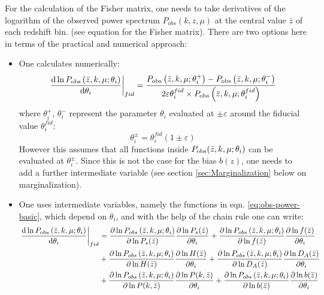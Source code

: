 For the calculation of the Fisher matrix, one needs to take derivatives
of the logarithm of the observed power spectrum $P_{obs}(k,z,\mu)$
at the central value $\bar{z}$ of each redshift bin. (see equation
for the Fisher matrix). There are two options here in terms of the
practical and numerical approach: 
\begin{itemize}
\item One calculates numerically: 
\begin{equation}
\left.\frac{\mbox{d}\ln P_{{\rm obs}}\left(\bar{z},k,\mu;\theta_{i}\right)}{\mbox{d}\theta_{i}}\right|_{fid}=\frac{P_{{\rm obs}}\left(\bar{z},k,\mu;\theta_{i}^{+}\right)-P_{{\rm obs}}\left(\bar{z},k,\mu;\theta_{i}^{-}\right)}{2\varepsilon\theta_{i}^{fid}\times P_{{\rm obs}}\left(\bar{z},k,\mu;\theta_{i}^{fid}\right)}
\end{equation}
where $\theta_{i}^{+}$, $\theta_{i}^{-}$ represent the parameter
$\theta_{i}$ evaluated at $\pm\varepsilon$ around the fiducial value
$\theta_{i}^{fid}$:
\begin{equation}
\theta_{i}^{\pm}=\theta_{i}^{fid}(1\pm\varepsilon)
\end{equation}
However this assumes that all functions inside $P_{{\rm obs}}(\bar{z},k,\mu;\theta_{i})$
can be evaluated at $\theta_{i}^{\pm}$. Since this is not the case
for the bias $b(z)$, one needs to add a further intermediate variable
(see section \ref{sec:Marginalization} below on marginalization).
\item One uses intermediate variables, namely the functions in eqn. \ref{eq:obs-power-basic},
which depend on $\theta_{i}$, and with the help of the chain rule
one can write:
\begin{align}
\left.\frac{\mbox{d}\ln P_{{\rm obs}}\left(\bar{z},k,\mu;\theta_{i}\right)}{\mbox{d}\theta_{i}}\right|_{fid} & =\frac{\partial\ln P_{obs}\left(\bar{z},k,\mu;\theta_{i}\right)}{\partial\ln P_{s}(\bar{z})}\frac{\partial\ln P_{s}(\bar{z})}{\partial\theta_{i}}+\frac{\partial\ln P_{obs}\left(\bar{z},k,\mu;\theta_{i}\right)}{\partial\ln f(\bar{z})}\frac{\partial\ln f(\bar{z})}{\partial\theta_{i}}\nonumber \\
 & +\frac{\partial\ln P_{obs}\left(\bar{z},k,\mu;\theta_{i}\right)}{\partial\ln H(\bar{z})}\frac{\partial\ln H(\bar{z})}{\partial\theta_{i}}+\frac{\partial\ln P_{obs}\left(\bar{z},k,\mu;\theta_{i}\right)}{\partial\ln D_{A}(\bar{z})}\frac{\partial\ln D_{A}(\bar{z})}{\partial\theta_{i}}\nonumber \\
 & +\frac{\partial\ln P_{obs}\left(\bar{z},k,\mu;\theta_{i}\right)}{\partial\ln P(k,\bar{z})}\frac{\partial\ln P(k,\bar{z})}{\partial\theta_{i}}+\frac{\partial\ln P_{obs}\left(\bar{z},k,\mu;\theta_{i}\right)}{\partial\ln b(\bar{z})}\frac{\partial\ln b(\bar{z})}{\partial\theta_{i}}\label{eq:derivatives-of-lnPobs}\\

\end{align}
\end{itemize}
